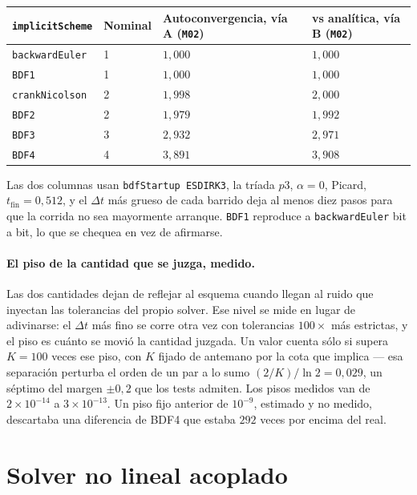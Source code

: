 \documentclass[11pt,a4paper]{article}
\newcommand{\code}[1]{\texttt{\small #1}}
\begin{document}
\begin{center}
\begin{tabular}{@{}llll@{}}
\toprule
\code{implicitScheme} & Nominal & Autoconvergencia, vía A (\code{M02}) & vs analítica, vía B (\code{M02}) \\
\midrule
\code{backwardEuler} & 1 & $1{,}000$ & $1{,}000$ \\
\code{BDF1}          & 1 & $1{,}000$ & $1{,}000$ \\
\code{crankNicolson} & 2 & $1{,}998$ & $2{,}000$ \\
\code{BDF2}          & 2 & $1{,}979$ & $1{,}992$ \\
\code{BDF3}          & 3 & $2{,}932$ & $2{,}971$ \\
\code{BDF4}          & 4 & $3{,}891$ & $3{,}908$ \\
\bottomrule
\end{tabular}
\end{center}

Las dos columnas usan \code{bdfStartup ESDIRK3}, la tríada $p3$, $\alpha=0$,
Picard, $t_{\text{fin}}=0{,}512$, y el $\Delta t$ más grueso de cada barrido deja
al menos diez pasos para que la corrida no sea mayormente arranque. \code{BDF1}
reproduce a \code{backwardEuler} bit a bit, lo que se chequea en vez de
afirmarse.

\paragraph{El piso de la cantidad que se juzga, medido.} Las dos cantidades dejan
de reflejar al esquema cuando llegan al ruido que inyectan las tolerancias del
propio solver. Ese nivel se mide en lugar de adivinarse: el $\Delta t$ más fino se
corre otra vez con tolerancias $100\times$ más estrictas, y el piso es cuánto se
movió la cantidad juzgada. Un valor cuenta sólo si supera $K=100$ veces ese piso,
con $K$ fijado de antemano por la cota que implica --- esa separación perturba el
orden de un par a lo sumo $(2/K)/\ln 2 = 0{,}029$, un séptimo del margen
$\pm0{,}2$ que los tests admiten. Los pisos medidos van de $2\times10^{-14}$ a
$3\times10^{-13}$. Un piso fijo anterior de $10^{-9}$, estimado y no medido,
descartaba una diferencia de BDF4 que estaba $292$ veces por encima del real.

\section{Solver no lineal acoplado}
\end{document}
